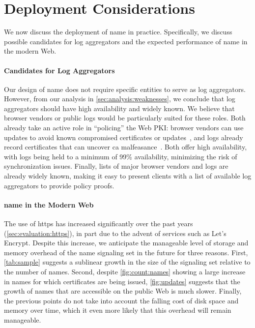 \section{Deployment Considerations}
\label{sec:discussion}

We now discuss the deployment of \ac{name} in practice. Specifically, we
discuss possible candidates for log aggregators and the expected performance of
\ac{name} in the modern Web.

\paragraph{Candidates for Log Aggregators}

Our design of \ac{name} does not require specific entities to serve as log
aggregators. However, from our analysis in \autoref{sec:analysis:weaknesses},
we conclude that log aggregators should have high availability and widely
known. We believe that browser vendors or public logs would be particularly
suited for these roles. Both already take an active role in ``policing'' the
Web PKI: browser vendors can use updates to avoid known compromised
certificates or updates~\cite{langley2012revocation}, and logs already record
certificates that can uncover \ac{ca} malfeasance~\cite{sleevi2015sustaining}.
Both offer high availability, with logs being held to a minimum of 99\%
availability, minimizing the risk of synchronization issues. Finally, lists
of major browser vendors and logs are already widely known, making it easy to
present clients with a list of available log aggregators to provide policy
proofs.

\paragraph{\ac{name} in the Modern Web}

The use of \ac{https} has increased significantly over the past years
(\autoref{sec:evaluation:https}), in part due to the advent of services such as
Let's Encrypt. Despite this increase, we anticipate the manageable level of
storage and memory overhead of the \ac{name} signaling set in the future for
three reasons. First, \autoref{tab:sample} suggests a sublinear growth in the
size of the signaling set relative to the number of names. Second, despite
\autoref{fig:count:names} showing a large increase in names for which
certificates are being issued, \autoref{fig:updates} suggests that the growth
of names that are accessible on the public Web is much slower. Finally, the
previous points do not take into account the falling cost of disk space and
memory over time, which it even more likely that this overhead will remain
manageable.

